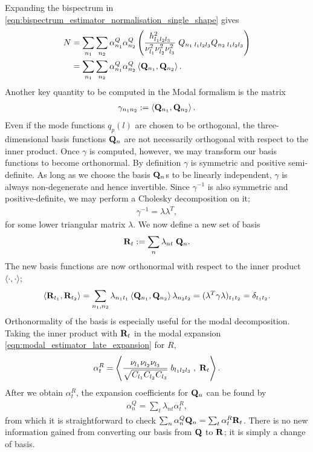 Expanding the bispectrum in \eqref{eqn:bispectrum_estimator_normalisation_single_shape} gives
\begin{align}
	N &= \sum_{n_1} \sum_{n_2} \alpha^Q_{n_1} \alpha^Q_{n_2} \left( \frac{h^2_{l_1 l_2 l_3}}{\nu_{l_1}^2 \nu_{l_2}^2 \nu_{l_3}^2 } \; Q_{n_1 \; l_1 l_2 l_3} Q_{n_2 \; l_1 l_2 l_3} \right) \\
	&= \sum_{n_1} \sum_{n_2} \alpha^Q_{n_1} \alpha^Q_{n_2} \left< \mathbf{Q}_{n_1}, \mathbf{Q}_{n_2} \right>. \label{eqn:modal_estimator_normalisation_Q}
\end{align}
Another key quantity to be computed in the Modal formalism is the matrix
\begin{align}
	\gamma_{n_1 n_2} :=  \left< \mathbf{Q}_{n_1} , \mathbf{Q}_{n_2} \right>.
\end{align}
Even if the mode functions $q_p(l)$ are chosen to be orthogonal, the three-dimensional basis functions $\mathbf{Q}_n$ are not necessarily orthogonal with respect to the inner product. Once $\gamma$ is computed, however, we may transform our basis functions to become orthonormal. By definition $\gamma$ is symmetric and positive semi-definite. As long as we choose the basis $\mathbf{Q}_n$s to be linearly independent, $\gamma$ is always non-degenerate and hence invertible. Since $\gamma^{-1}$ is also symmetric and positive-definite, we may perform a Cholesky decomposition on it;
\begin{align}
	\gamma^{-1} = \lambda \lambda^T,
\end{align}
for some lower triangular matrix $\lambda$. We now define a new set of basis
\begin{align}
	\mathbf{R}_t := \sum_n \lambda_{nt} \; \mathbf{Q}_{n}.
\end{align}
The new basis functions are now orthonormal with respect to the inner product $\langle \cdot,\cdot \rangle$;
\begin{align}
	\left< \mathbf{R}_{t_1} , \mathbf{R}_{t_2} \right> = \sum_{n_1,n_2} \lambda_{n_1 t_1} \left< \mathbf{Q}_{n_1} , \mathbf{Q}_{n_2} \right> \lambda_{n_2 t_2} = (\lambda^T \gamma \lambda)_{t_1 t_2} = \delta_{t_1 t_2}.
\end{align}
Orthonormality of the basis is especially useful for the modal decomposition. Taking the inner product with $\mathbf{R}_t$ in the modal expansion \eqref{eqn:modal_estimator_late_expansion} for $R$,
\begin{align}
	\alpha^R_t = \left< \frac{\nu_{l_1} \nu_{l_2} \nu_{l_3}}{\sqrt{C_{l_1} C_{l_2} C_{l_3}}} \; b_{l_1 l_2 l_3} \;,\; \mathbf{R}_t \right>.
\end{align}
After we obtain $\alpha^R_t$, the expansion coefficients for $\mathbf{Q}_n$ can be found by
\begin{align}
	\alpha^Q_n = \sum_t \lambda_{nt} \alpha^R_t,
\end{align}
from which it is straightforward to check $\sum_n \alpha^Q_n \mathbf{Q}_n = \sum_t \alpha^R_t \mathbf{R}_t$. There is no new information gained from converting our basis from $\mathbf{Q}$ to $\mathbf{R}$; it is simply a change of basis.

